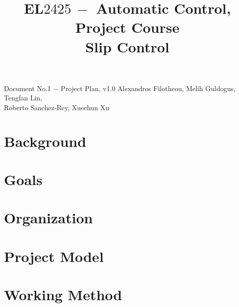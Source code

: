\documentclass[a4paper,12pt,oneside,onecolumn]{article} %
\title{
	\vspace{1in}
  EL$2425\ -$ Automatic Control, Project Course \\
  \vspace{0.2in}
  Slip Control
}
\begin{document}
	\maketitle

  \vfill

  \begin{center}

    \large Document No.1 $-$ Project Plan, v1.0
    \vfill
    Alexandros Filotheou, Melih Guldogus, Tengfan Lin,\\ Roberto Sanchez-Rey, Xuechun Xu
  \end{center}

  \newpage

  \section{Background}
    

  \section{Goals}
    

  \section{Organization}
    

  \section{Project Model}
    

  \section{Working Method}
    
\end{document}
